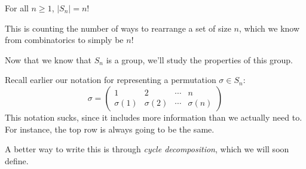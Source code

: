 \documentclass[12pt,letterpaper]{algebra_book}
\theoremstyle{definition}
\begin{document}
    \begin{proposition}
        For all $n \ge 1$, $|S_n| = n!$ 
    \end{proposition}

    \begin{prf}
        This is counting the number of ways to rearrange a set of size
        $n$, which we know from combinatorics to simply be $n!$
    \end{prf}

    Now that we know that $S_n$ is a group, we'll study the properties
    of this group. 

    Recall earlier our notation for representing a permutation $\sigma
    \in S_n$:
    \[
       \sigma =  
       \begin{pmatrix}
            1 & 2 & \cdots & n\\
            \sigma(1) & \sigma(2) & \cdots & \sigma(n)
         \end{pmatrix}
    \]
    This notation sucks, since it includes more information than we
    actually need to. For instance, the top row is always going to be
    the same. 
    
    A better way to write this is through
    \textit{cycle decomposition}, which we will soon define.
\end{document}
